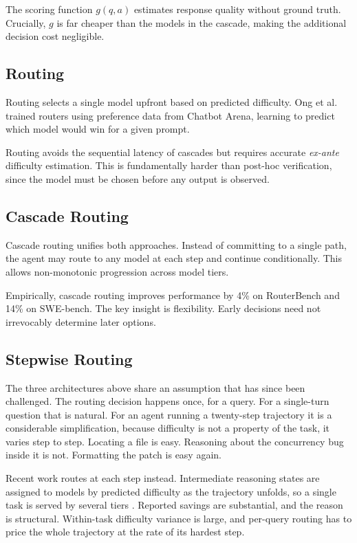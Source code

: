 The scoring function $g(q, a)$ estimates response quality without ground truth. Crucially, $g$ is far cheaper than the models in the cascade, making the additional decision cost negligible.

\subsection{Routing}

Routing selects a single model upfront based on predicted difficulty. Ong et al.\ \cite{ong2025routellm} trained routers using preference data from Chatbot Arena, learning to predict which model would win for a given prompt.

Routing avoids the sequential latency of cascades but requires accurate \emph{ex-ante} difficulty estimation. This is fundamentally harder than post-hoc verification, since the model must be chosen before any output is observed.

\subsection{Cascade Routing}

Cascade routing \cite{dekoninck2025cascade} unifies both approaches. Instead of committing to a single path, the agent may route to any model at each step and continue conditionally. This allows non-monotonic progression across model tiers.

Empirically, cascade routing improves performance by 4\% on RouterBench and 14\% on SWE-bench. The key insight is flexibility. Early decisions need not irrevocably determine later options.

\subsection{Stepwise Routing}

The three architectures above share an assumption that has since been challenged. The routing decision happens once, for a query. For a single-turn question
that is natural. For an agent running a twenty-step trajectory it is a
considerable simplification, because difficulty is not a property of the task, it varies step to step. Locating a file is easy. Reasoning about the concurrency
bug inside it is not. Formatting the patch is easy again.

Recent work routes at each step instead. Intermediate reasoning states are
assigned to models by predicted difficulty as the trajectory unfolds, so a single
task is served by several tiers \cite{policyrouting2026, confrouting2026}.
Reported savings are substantial, and the reason is structural. Within-task
difficulty variance is large, and per-query routing has to price the whole
trajectory at the rate of its hardest step.

